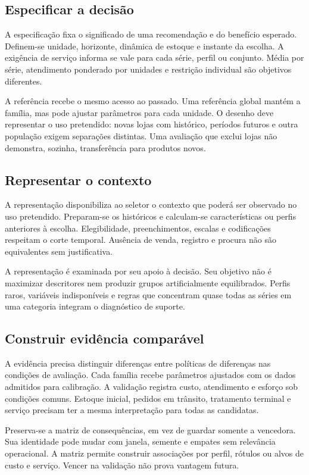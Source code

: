 \subsection{Especificar a decisão}
A especificação fixa o significado de uma recomendação e do benefício esperado. Definem-se unidade, horizonte, dinâmica de estoque e instante da escolha. A exigência de serviço informa se vale para cada série, perfil ou conjunto. Média por série, atendimento ponderado por unidades e restrição individual são objetivos diferentes.

A referência recebe o mesmo acesso ao passado. Uma referência global mantém a família, mas pode ajustar parâmetros para cada unidade. O desenho deve representar o uso pretendido: novas lojas com histórico, períodos futuros e outra população exigem separações distintas. Uma avaliação que exclui lojas não demonstra, sozinha, transferência para produtos novos.

\subsection{Representar o contexto}
A representação disponibiliza ao seletor o contexto que poderá ser observado no uso pretendido. Preparam-se os históricos e calculam-se características ou perfis anteriores à escolha. Elegibilidade, preenchimentos, escalas e codificações respeitam o corte temporal. Ausência de venda, registro e procura não são equivalentes sem justificativa.

A representação é examinada por seu apoio à decisão. Seu objetivo não é maximizar descritores nem produzir grupos artificialmente equilibrados. Perfis raros, variáveis indisponíveis e regras que concentram quase todas as séries em uma categoria integram o diagnóstico de suporte.

\subsection{Construir evidência comparável}
A evidência precisa distinguir diferenças entre políticas de diferenças nas condições de avaliação. Cada família recebe parâmetros ajustados com os dados admitidos para calibração. A validação registra custo, atendimento e esforço sob condições comuns. Estoque inicial, pedidos em trânsito, tratamento terminal e serviço precisam ter a mesma interpretação para todas as candidatas.

Preserva-se a matriz de consequências, em vez de guardar somente a vencedora. Sua identidade pode mudar com janela, semente e empates sem relevância operacional. A matriz permite construir associações por perfil, rótulos ou alvos de custo e serviço. Vencer na validação não prova vantagem futura.

